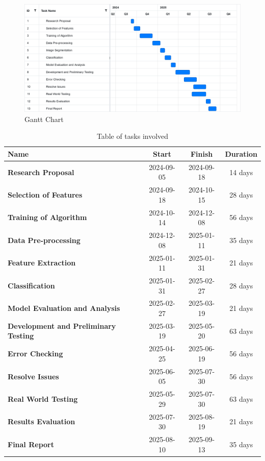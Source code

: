 \documentclass[a4paper, 12pt]{article}
\begin{document}
\begin{figure}[!ht]
    \centering
    \includegraphics[width=1\linewidth]{gantt.png}
    \caption{Gantt Chart}
    \label{gantt:1}
\end{figure}

\begin{table}[!ht]
    \centering
    \begin{tabular}{|l|c|c|c|}
    \hline
        \textbf{Name} & \textbf{Start} & \textbf{Finish} & \textbf{Duration} \\ \hline
        \textbf{Research Proposal} & 2024-09-05 & 2024-09-18 & 14 days \\ \hline
        \textbf{Selection of Features } & 2024-09-18 & 2024-10-15 & 28 days \\ \hline
        \textbf{Training of Algorithm} & 2024-10-14 & 2024-12-08 & 56 days \\ \hline
        \textbf{Data Pre-processing} & 2024-12-08 & 2025-01-11 & 35 days \\ \hline
        \textbf{Feature Extraction} & 2025-01-11 & 2025-01-31 & 21 days \\ \hline
        \textbf{Classification} & 2025-01-31 & 2025-02-27 & 28 days \\ \hline
        \textbf{Model Evaluation and Analysis} & 2025-02-27 & 2025-03-19 & 21 days \\ \hline
        \textbf{Development and Preliminary Testing} & 2025-03-19 & 2025-05-20 & 63 days \\ \hline
        \textbf{Error Checking} & 2025-04-25 & 2025-06-19 & 56 days \\ \hline
        \textbf{Resolve Issues} & 2025-06-05 & 2025-07-30 & 56 days \\ \hline
        \textbf{Real World Testing} & 2025-05-29 & 2025-07-30 & 63 days \\ \hline
        \textbf{Results Evaluation} & 2025-07-30 & 2025-08-19 & 21 days \\ \hline
        \textbf{Final Report} & 2025-08-10 & 2025-09-13 & 35 days \\ \hline
    \end{tabular}
    \caption{Table of tasks involved}
    \label{table:2}
\end{table}
\end{document}
